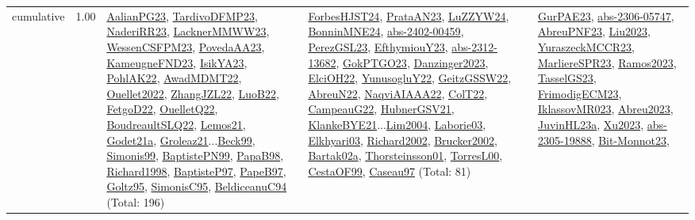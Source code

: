 {\begin{longtable}{p{3cm}r>{\raggedright\arraybackslash}p{6cm}>{\raggedright\arraybackslash}p{6cm}>{\raggedright\arraybackslash}p{8cm}}
\index{cumulative}\index{Constraints!cumulative}cumulative &  1.00 & \hyperref[detail:AalianPG23]{AalianPG23}, \hyperref[detail:TardivoDFMP23]{TardivoDFMP23}, \hyperref[detail:NaderiRR23]{NaderiRR23}, \hyperref[detail:LacknerMMWW23]{LacknerMMWW23}, \hyperref[detail:WessenCSFPM23]{WessenCSFPM23}, \hyperref[detail:PovedaAA23]{PovedaAA23}, \hyperref[detail:KameugneFND23]{KameugneFND23}, \hyperref[detail:IsikYA23]{IsikYA23}, \hyperref[detail:PohlAK22]{PohlAK22}, \hyperref[detail:AwadMDMT22]{AwadMDMT22}, \hyperref[detail:Ouellet2022]{Ouellet2022}, \hyperref[detail:ZhangJZL22]{ZhangJZL22}, \hyperref[detail:LuoB22]{LuoB22}, \hyperref[detail:FetgoD22]{FetgoD22}, \hyperref[detail:OuelletQ22]{OuelletQ22}, \hyperref[detail:BoudreaultSLQ22]{BoudreaultSLQ22}, \hyperref[detail:Lemos21]{Lemos21}, \hyperref[detail:Godet21a]{Godet21a}, \hyperref[detail:Groleaz21]{Groleaz21}...\hyperref[detail:Beck99]{Beck99}, \hyperref[detail:Simonis99]{Simonis99}, \hyperref[detail:BaptistePN99]{BaptistePN99}, \hyperref[detail:PapaB98]{PapaB98}, \hyperref[detail:Richard1998]{Richard1998}, \hyperref[detail:BaptisteP97]{BaptisteP97}, \hyperref[detail:PapeB97]{PapeB97}, \hyperref[detail:Goltz95]{Goltz95}, \hyperref[detail:SimonisC95]{SimonisC95}, \hyperref[detail:BeldiceanuC94]{BeldiceanuC94} (Total: 196) & \hyperref[detail:ForbesHJST24]{ForbesHJST24}, \hyperref[detail:PrataAN23]{PrataAN23}, \hyperref[detail:LuZZYW24]{LuZZYW24}, \hyperref[detail:BonninMNE24]{BonninMNE24}, \hyperref[detail:abs-2402-00459]{abs-2402-00459}, \hyperref[detail:PerezGSL23]{PerezGSL23}, \hyperref[detail:EfthymiouY23]{EfthymiouY23}, \hyperref[detail:abs-2312-13682]{abs-2312-13682}, \hyperref[detail:GokPTGO23]{GokPTGO23}, \hyperref[detail:Danzinger2023]{Danzinger2023}, \hyperref[detail:ElciOH22]{ElciOH22}, \hyperref[detail:YunusogluY22]{YunusogluY22}, \hyperref[detail:GeitzGSSW22]{GeitzGSSW22}, \hyperref[detail:AbreuN22]{AbreuN22}, \hyperref[detail:NaqviAIAAA22]{NaqviAIAAA22}, \hyperref[detail:ColT22]{ColT22}, \hyperref[detail:CampeauG22]{CampeauG22}, \hyperref[detail:HubnerGSV21]{HubnerGSV21}, \hyperref[detail:KlankeBYE21]{KlankeBYE21}...\hyperref[detail:Lim2004]{Lim2004}, \hyperref[detail:Laborie03]{Laborie03}, \hyperref[detail:Elkhyari03]{Elkhyari03}, \hyperref[detail:Richard2002]{Richard2002}, \hyperref[detail:Brucker2002]{Brucker2002}, \hyperref[detail:Bartak02a]{Bartak02a}, \hyperref[detail:Thorsteinsson01]{Thorsteinsson01}, \hyperref[detail:TorresL00]{TorresL00}, \hyperref[detail:CestaOF99]{CestaOF99}, \hyperref[detail:Caseau97]{Caseau97} (Total: 81) & \hyperref[detail:GurPAE23]{GurPAE23}, \hyperref[detail:abs-2306-05747]{abs-2306-05747}, \hyperref[detail:AbreuPNF23]{AbreuPNF23}, \hyperref[detail:Liu2023]{Liu2023}, \hyperref[detail:YuraszeckMCCR23]{YuraszeckMCCR23}, \hyperref[detail:MarliereSPR23]{MarliereSPR23}, \hyperref[detail:Ramos2023]{Ramos2023}, \hyperref[detail:TasselGS23]{TasselGS23}, \hyperref[detail:FrimodigECM23]{FrimodigECM23}, \hyperref[detail:IklassovMR023]{IklassovMR023}, \hyperref[detail:Abreu2023]{Abreu2023}, \hyperref[detail:JuvinHL23a]{JuvinHL23a}, \hyperref[detail:Xu2023]{Xu2023}, \hyperref[detail:abs-2305-19888]{abs-2305-19888}, \hyperref[detail:Bit-Monnot23]{Bit-Monnot23}, 
\end{longtable}}
